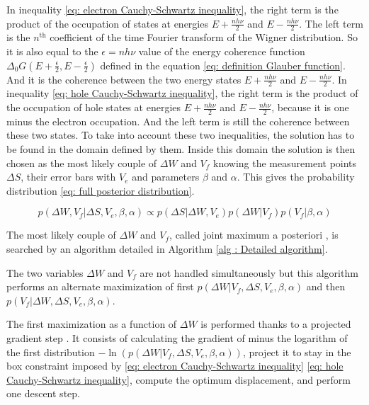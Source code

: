 In inequality \eqref{eq: electron Cauchy-Schwartz inequality}, the right term is the product of the occupation of states at energies $E+\frac{nh\nu}{2}$ and $E-\frac{nh\nu}{2}$.
The left term is the $n^{\mathrm{th}}$ coefficient of the time Fourier transform of the Wigner distribution.
So it is also equal to the $\epsilon = nh\nu$ value of the energy coherence function $\Delta_{0}G\left(E+\frac{\epsilon}{2},E-\frac{\epsilon}{2}\right)$ defined in the equation \eqref{eq: definition Glauber function}.
And it is the coherence between the two energy states $E+\frac{nh\nu}{2}$ and $E-\frac{nh\nu}{2}$.
In inequality \eqref{eq: hole Cauchy-Schwartz inequality}, the right term is the product of the occupation of hole states at energies $E+\frac{nh\nu}{2}$ and $E-\frac{nh\nu}{2}$, because it is one minus the electron occupation.
And the left term is still the coherence between these two states.
To take into account these two inequalities, the solution has to be found in the domain defined by them.
Inside this domain the solution is then chosen as the most likely couple of $\Delta W$ and $V_{f}$ knowing the measurement points $\Delta S$, their error bars with $V_{e}$ and parameters $\beta$ and $\alpha$.
This gives the probability distribution \eqref{eq: full posterior distribution}.

\begin{equation}
p\left(\Delta W, V_{f}\left|\right.\Delta S, V_{e}, \beta, \alpha\right) \propto p\left(\Delta S\left|\right.\Delta W, V_{e}\right)p\left(\Delta W \left|\right. V_{f}\right)p\left(V_{f}\left|\right.\beta,\alpha\right) \label{eq: full posterior distribution}
\end{equation}

The most likely couple of $\Delta W$ and $V_{f}$, called joint maximum a posteriori \cite{ayasso2010joint,zhao2016joint}, is searched by an algorithm detailed in Algorithm \ref{alg : Detailed algorithm}.

The two variables $\Delta W$ and $V_{f}$ are not handled simultaneously but this algorithm performs an alternate maximization of first $p\left(\Delta W\left|\right.V_{f}, \Delta S, V_{e}, \beta, \alpha\right)$ and then $p\left(V_{f}\left|\right.\Delta W, \Delta S, V_{e}, \beta, \alpha\right)$.

The first maximization as a function of $\Delta W$ is performed thanks to a projected gradient step \cite{bertsekas1997nonlinear,figueiredo2007gradient}.
It consists of calculating the gradient of minus the logarithm of the first distribution $-\ln\left(p\left(\Delta W\left|\right.V_{f}, \Delta S, V_{e}, \beta, \alpha\right)\right)$, project it to stay in the box constraint imposed by \eqref{eq: electron Cauchy-Schwartz inequality} \eqref{eq: hole Cauchy-Schwartz inequality}, compute the optimum displacement, and perform one descent step.

